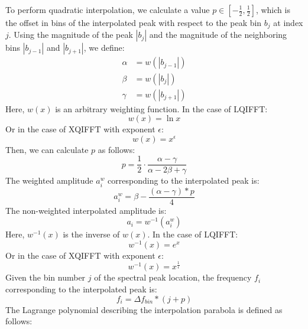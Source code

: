 \documentclass[a4paper,10pt,twocolumn]{article}
\begin{document}
To perform quadratic interpolation, we calculate a value $p \in [-\frac{1}{2}, \frac{1}{2}]$, which is the offset in bins of the interpolated peak with respect to the peak bin $b_j$ at index $j$. Using the magnitude of the peak $|b_j|$ and the magnitude of the neighboring bins $|b_{j - 1}|$ and $|b_{j + 1}|$, we define:
\begin{align*}
    \alpha &= w(|b_{j - 1}|) \\
    \beta  &= w(|b_{j}|) \\
    \gamma &= w(|b_{j + 1}|)
\end{align*}
Here, $w(x)$ is an arbitrary weighting function. In the case of LQIFFT:
\[ w(x) = \ln{x} \]
Or in the case of XQIFFT with exponent $\epsilon$:
\[ w(x) = x^{\epsilon} \]
Then, we can calculate $p$ as follows:
\[ p = \frac{1}{2} \cdot \frac{\alpha - \gamma}{\alpha - 2\beta + \gamma} \]
The weighted amplitude $a_i^w$ corresponding to the interpolated peak is:
\[ a_i^w = \beta - \frac{(\alpha - \gamma) * p}{4} \]
The non-weighted interpolated amplitude is:
\[ a_i = w^{-1}(a_i^w) \]
Here, $w^{-1}(x)$ is the inverse of $w(x)$. In the case of LQIFFT:
\[ w^{-1}(x) = e^{x} \]
Or in the case of XQIFFT with exponent $\epsilon$:
\[ w^{-1}(x) = x^{\frac{1}{\epsilon}} \]
Given the bin number $j$ of the spectral peak location, the frequency $f_i$ corresponding to the interpolated peak is:
\[ f_i = \Delta f_{bin} * (j + p) \]
The Lagrange polynomial describing the interpolation parabola is defined as follows:
\end{document}
